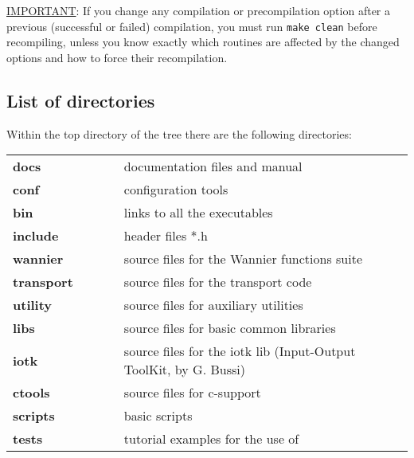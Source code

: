 \noindent \underline {IMPORTANT}: If you change any compilation or
precompilation option after a previous (successful or failed)
compilation, you must run \texttt{make clean} before recompiling,
unless you know exactly which routines are affected by the changed
options and how to force their recompilation.


\subsection{List of directories}
Within the top directory of the \WANT{} tree there are the
following directories: \\

\begin{tabular}{lll}
{\bf docs}          & $\qquad$  &   documentation files and manual \\
{\bf conf}          & $\qquad$  &   configuration tools \\
{\bf bin}           & $\qquad$  &   links to all the executables \\
{\bf include}       & $\qquad$  &   header files *.h \\
{\bf wannier}       & $\qquad$  &   source files for the Wannier functions suite \\
{\bf transport}     & $\qquad$  &   source files for the transport code \\
{\bf utility}       & $\qquad$  &   source files for auxiliary utilities\\
{\bf libs}          & $\qquad$  &   source files for basic common libraries \\
{\bf iotk}          & $\qquad$  &   source files for the iotk lib (Input-Output ToolKit, by G. Bussi) \\
{\bf ctools}        & $\qquad$  &   source files for c-support\\
{\bf scripts}       & $\qquad$  &   basic scripts\\
{\bf tests}         & $\qquad$  &   tutorial examples for the use of \WANT{}\\
\end{tabular}

